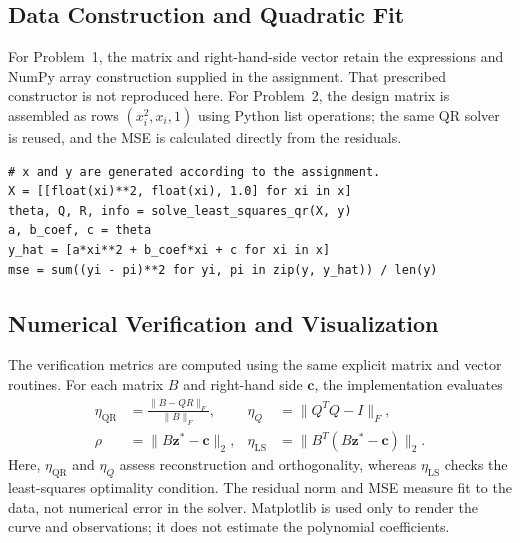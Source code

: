 \subsection{Data Construction and Quadratic Fit}

For Problem~1, the matrix and right-hand-side vector retain the expressions
and NumPy array construction supplied in the assignment. That prescribed
constructor is not reproduced here. For Problem~2, the design matrix is
assembled as rows $(x_i^2,x_i,1)$ using Python list operations; the same QR
solver is reused, and the MSE is calculated directly from the residuals.

\begin{lstlisting}[style=pythonTC,
    caption={Problem 2: design matrix, fitted values, and explicit MSE.},
    label={lst:tc3-data-mse}]
# x and y are generated according to the assignment.
X = [[float(xi)**2, float(xi), 1.0] for xi in x]
theta, Q, R, info = solve_least_squares_qr(X, y)
a, b_coef, c = theta
y_hat = [a*xi**2 + b_coef*xi + c for xi in x]
mse = sum((yi - pi)**2 for yi, pi in zip(y, y_hat)) / len(y)
\end{lstlisting}

\subsection{Numerical Verification and Visualization}

The verification metrics are computed using the same explicit matrix and
vector routines. For each matrix $B$ and right-hand side $\mathbf{c}$, the
implementation evaluates
\begin{align}
    \eta_{\mathrm{QR}} &= \frac{\|B-QR\|_F}{\|B\|_F}, &
    \eta_Q &= \|Q^TQ-I\|_F,\\
    \rho &= \|B\mathbf{z}^*-\mathbf{c}\|_2, &
    \eta_{\mathrm{LS}} &= \|B^T(B\mathbf{z}^*-\mathbf{c})\|_2.
\end{align}
Here, $\eta_{\mathrm{QR}}$ and $\eta_Q$ assess reconstruction and
orthogonality, whereas $\eta_{\mathrm{LS}}$ checks the least-squares
optimality condition. The residual norm and MSE measure fit to the data,
not numerical error in the solver. Matplotlib is used only to render the
curve and observations; it does not estimate the polynomial coefficients.
